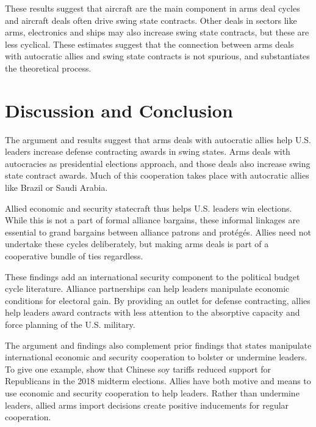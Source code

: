 \documentclass[12pt]{article}
\begin{document}
These results suggest that aircraft are the main component in arms deal cycles and aircraft deals often drive swing state contracts. 
Other deals in sectors like arms, electronics and ships may also increase swing state contracts, but these are less cyclical. 
These estimates suggest that the connection between arms deals with autocratic allies and swing state contracts is not spurious, and substantiates the theoretical process. 



\section{Discussion and Conclusion}


The argument and results suggest that arms deals with autocratic allies help U.S. leaders increase defense contracting awards in swing states. 
Arms deals with autocracies as presidential elections approach, and those deals also increase swing state contract awards. 
Much of this cooperation takes place with autocratic allies like Brazil or Saudi Arabia.





Allied economic and security statecraft thus helps U.S. leaders win elections. 
While this is not a part of formal alliance bargains, these informal linkages are essential to grand bargains between alliance patrons and prot{\'e}g{\'e}s.
Allies need not undertake these cycles deliberately, but making arms deals is part of a cooperative bundle of ties regardless.


These findings add an international security component to the political budget cycle literature.
Alliance partnerships can help leaders manipulate economic conditions for electoral gain. 
By providing an outlet for defense contracting, allies help leaders award contracts with less attention to the absorptive capacity and force planning of the U.S. military.


The argument and findings also complement prior findings that states manipulate international economic and security cooperation to bolster or undermine leaders. 
To give one example, \citet{ChyzhUrbatsch2021} show that Chinese soy tariffs reduced support for Republicans in the 2018 midterm elections. 
Allies have both motive and means to use economic and security cooperation to help leaders. 
Rather than undermine leaders, allied arms import decisions create positive inducements for regular cooperation.
\end{document}
